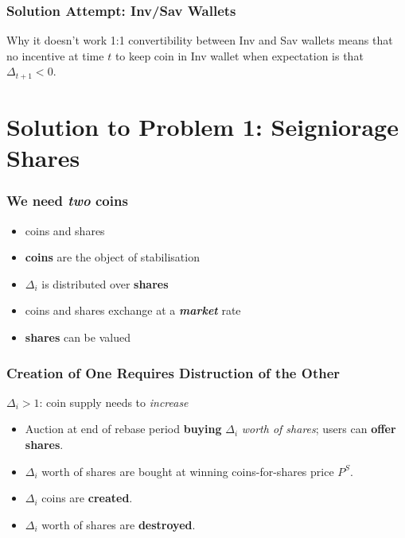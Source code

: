 \documentclass{beamer}
\begin{document}
\begin{frame}
    \frametitle{Solution Attempt: Inv/Sav Wallets}

  \begin{block}{Why it doesn't work}
    1:1 convertibility between Inv and Sav wallets means that no
    incentive at time $t$ to keep coin in Inv wallet when expectation
    is that $\Delta_{t+1} < 0$.
  \end{block}

\end{frame}

\section{Solution to Problem 1: Seigniorage Shares}

\begin{frame}
  \frametitle{We need \emph{two} coins}

  \begin{itemize}
  \item coins and shares
  \item \textbf{coins} are the object of stabilisation
  \item $\Delta_{i}$ is distributed over \textbf{shares}
  \item coins and shares exchange at a \textbf{\emph{market}} rate
  \item \textbf{shares} can be valued
  \end{itemize}

\end{frame}

\begin{frame}
  \frametitle{Creation of One Requires Distruction of the Other}
  \begin{block}{$\Delta_{i} > 1$: coin supply needs to \emph{increase}}
    \begin{itemize}
    \item Auction at end of rebase period \textbf{buying} $\Delta_{i}$
      \emph{worth of shares}; users can \textbf{offer shares}.
    \item $\Delta_{i}$ worth of shares are bought at winning
      coins-for-shares price $P^{S}$.
    \item $\Delta_{i}$ coins are \textbf{created}.
    \item $\Delta_{i}$ worth of shares are \textbf{destroyed}.
    \end{itemize}
  \end{block}

\end{frame}
\end{document}
